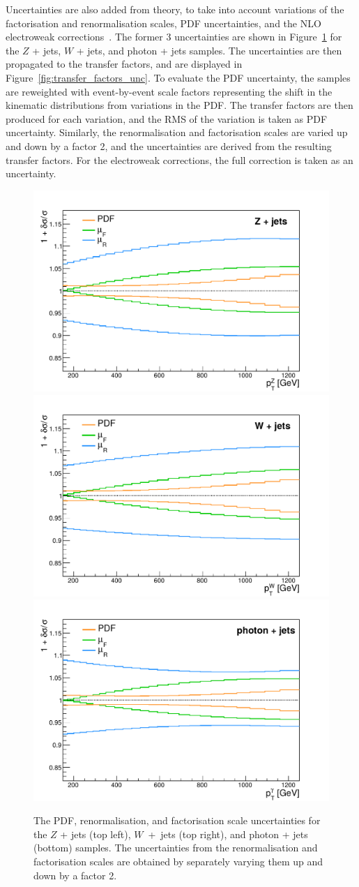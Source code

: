 Uncertainties are also added from theory, to take into account variations of the factorisation and renormalisation scales, PDF uncertainties, and the NLO electroweak corrections~\cite{Kuhn:2005gv, Kallweit:2015fta, Kallweit:2014xda, Kallweit:2015dum}. The former 3 uncertainties are shown in Figure~\ref{fig:kfactors_unc} for the $Z$ + jets, $W$ + jets, and photon + jets samples. The  uncertainties are then propagated to the transfer factors, and are displayed in Figure~\ref{fig:transfer_factors_unc}. To evaluate the PDF uncertainty, the samples are reweighted with event-by-event scale factors representing the shift in the kinematic distributions from variations in the PDF. The transfer factors are then produced for each variation, and the RMS of the variation is taken as PDF uncertainty. Similarly, the renormalisation and factorisation scales are varied up and down by a factor 2, and the uncertainties are derived from the resulting transfer factors. For the electroweak corrections, the full correction is taken as an uncertainty.

\begin{figure}[ht]
  \centering
 \includegraphics[width=.49\textwidth]{Z_uncertainties_smooth.pdf} 
 \includegraphics[width=.49\textwidth]{W_uncertainties_smooth_new.pdf} \\
 \includegraphics[width=.49\textwidth]{gamma_uncertainties_smooth.pdf} 
 \caption{The PDF, renormalisation, and factorisation scale uncertainties for the $Z$ + jets (top left), $W$~+~jets (top right), and photon + jets (bottom) samples. The uncertainties from the renormalisation and factorisation scales are obtained by separately varying them up and down by a factor 2.}
 \label{fig:kfactors_unc}
\end{figure}

